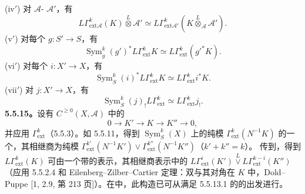 (iv$'$) 对 $\mathscr A$- $\mathscr A'$，有
\[L\Gamma^k_{\mathrm{ext}\mathscr A}(K)\overset L\otimes\mathscr A'\simeq L\Gamma^k_{\mathrm{ext}\mathscr A'}(K\overset L\otimes_{\mathscr A}\mathscr A').\]
(v$'$) 对每个 $g:S'\to S$，有
\[\operatorname{Sym}^k_g(g')^*L\Gamma^k_{\mathrm{ext}}K\simeq L\Gamma^k_{\mathrm{ext}}(g'^*K).\]
(vi$'$) 对每个 $i:X'\to X$，有
\[\operatorname{Sym}^k_S(i)^*L\Gamma^k_{\mathrm{ext}}K\simeq L\Gamma^k_{\mathrm{ext}}i^*K.\]
(vii$'$) 对 $j:X'\to X$，有
\[\operatorname{Sym}^k_S(j)_!L\Gamma^k_{\mathrm{ext}}\simeq L\Gamma^k_{\mathrm{ext}}j_!.\]
\textbf{5.5.15。}设有 $C^{\geq0}(X,\mathscr A)$ 中的
\[0\longrightarrow K'\longrightarrow K\longrightarrow K''\longrightarrow0,\]
并应用 $\Gamma^k_{\mathrm{ext}}$（5.5.3）。如 5.5.11，得到 $\operatorname{Sym}^k_S(X)$ 上的纯模 $\Gamma^k_{\mathrm{ext}}(N^{-1}K)$ 的一个，其相继商为纯模 $\Gamma^{k'}_{\mathrm{ext}}(N^{-1}K')\vee\Gamma^{k''}_{\mathrm{ext}}(N^{-1}K'')$（$k'+k''=k$）。
传到，得到 $L\Gamma^k_{\mathrm{ext}}(K)$ 可由一个带的表示，其相继商表示中的 $L\Gamma^i_{\mathrm{ext}}(K')\overset L\vee L\Gamma^{k-i}_{\mathrm{ext}}(K'')$（应用 5.5.2.4 和 Eilenberg--Zilber--Cartier 定理：双与其对角在 $K$ 中，Dold--Puppe [1, 2.9, 第 213 页]）。在中，此构造已可从满足 5.5.13.1 的的出发进行。


